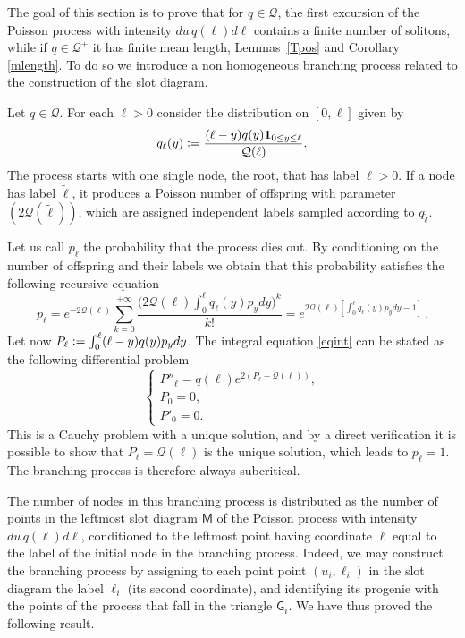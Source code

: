 \documentclass[12pt]{article}
\numberwithin{equation}{section}
\newcommand{\sG}{\mathsf{G}}
\newcommand{\sM}{\mathsf{M}}
\newcommand{\one}{{\bf 1}\hskip-.5mm} %
\begin{document}
The goal of this section is to prove that for $q\in \mathscr Q$, the first excursion of the Poisson process with intensity $du\,q(\ell)d\ell$ contains a finite number of solitons, while if $q\in \mathscr Q^+$ it has finite mean length, Lemmas~\ref{Tpos} and Corollary \ref{mlength}. To do so we introduce a non homogeneous branching process related to the construction of the slot diagram. 



Let $q\in \mathscr Q$. For each $\ell>0$ consider the distribution on $[0,\ell ]$ given by 
\begin{align}
	q_\ell(y)\vcentcolon =\frac{(\ell-y)q(y)\one_{\,0\leq y\leq \ell}}{\mathcal Q(\ell)}.
\end{align}
The process starts with one single node, the root, that has label $\ell>0$. If a node has label $\tilde \ell$, it produces a Poisson number of offspring with parameter $(2 \mathcal Q(\tilde \ell))$, which are assigned independent labels sampled according to $q_{\tilde \ell}$.


Let us call $p_\ell$ the probability that the process dies out. By conditioning on the number of offspring and their labels we obtain that this probability satisfies the following recursive equation
\begin{equation}\label{eqint}
	p_\ell=e^{-2\mathcal Q(\ell)}\sum_{k=0}^{+\infty}\frac{\big(2\mathcal Q(\ell)\int_0^\ell q_\ell(y)p_y dy\big)^k}{k!}=e^{2\mathcal Q(\ell)[\int_0^\ell q_\ell(y)p_y dy-1]}\,.
\end{equation}
Let now $P_\ell\vcentcolon =\int_0^\ell(\ell-y) q(y)p_ydy$. The integral equation \eqref{eqint} can be stated as the following differential problem
\begin{equation}\label{eqnPl}
	\left\{
	\begin{array}{l}
		P''_\ell=q(\ell)e^{2(P_\ell-\mathcal Q(\ell))},\\
		P_0=0,\\
		P'_0=0.
	\end{array}
	\right.
\end{equation}
This is a Cauchy problem with a unique solution, and by a direct verification it is possible to show that $P_\ell=\mathcal Q(\ell)$ is the unique solution, which leads to $p_\ell=1$. The branching process is therefore always subcritical. 

The number of nodes in this branching process is distributed as the number of points in the leftmost slot diagram $\sM$ of the Poisson process with intensity $du\,q(\ell) d\ell$, conditioned to the leftmost point having coordinate $\ell$ equal to the label of the initial node in the branching process. Indeed, we may construct the branching process by assigning to each point point $(u_i, \ell_i)$ in the slot diagram the label $\ell_i$ (its second coordinate), and identifying its progenie with the points of the process that fall in the triangle $\sG_i$. We have thus proved the following result.
\end{document}
